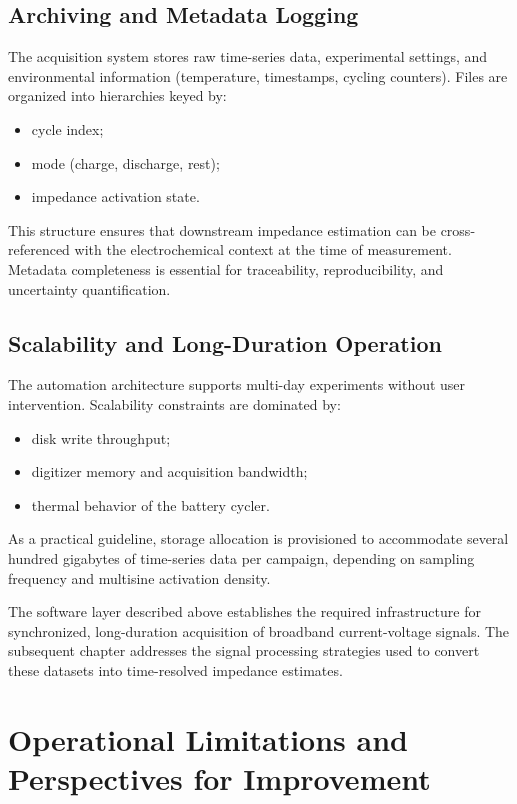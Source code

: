 \subsection{Archiving and Metadata Logging}

The acquisition system stores raw time-series data, experimental settings, and environmental information (temperature, timestamps, cycling counters). Files are organized into hierarchies keyed by:
\begin{itemize}
    \item cycle index;
    \item mode (charge, discharge, rest);
    \item impedance activation state.
\end{itemize}
This structure ensures that downstream impedance estimation can be cross-referenced with the electrochemical context at the time of measurement. Metadata completeness is essential for traceability, reproducibility, and uncertainty quantification.

\subsection{Scalability and Long-Duration Operation}

The automation architecture supports multi-day experiments without user intervention. Scalability constraints are dominated by:
\begin{itemize}
    \item disk write throughput;
    \item digitizer memory and acquisition bandwidth;
    \item thermal behavior of the battery cycler.
\end{itemize}
As a practical guideline, storage allocation is provisioned to accommodate several hundred gigabytes of time-series data per campaign, depending on sampling frequency and multisine activation density.

The software layer described above establishes the required infrastructure for synchronized, long-duration acquisition of broadband current-voltage signals. The subsequent chapter addresses the signal processing strategies used to convert these datasets into time-resolved impedance estimates.

\section{Operational Limitations and Perspectives for Improvement}
\label{sec:limitations}

